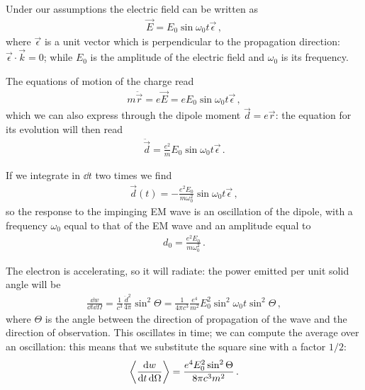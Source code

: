 \documentclass[main.tex]{subfiles}
\begin{document}

Under our assumptions the electric field can be written as 
%
\begin{align}
\vec{E} = E_0 \sin \omega_0 t \vec{\epsilon}
\,,
\end{align}
%
where \(\vec{\epsilon}\) is a unit vector which is perpendicular to the propagation direction: \(\vec{\epsilon} \cdot \vec{k} = 0\); while \(E_0 \) is the amplitude of the electric field and \(\omega_0\) is its frequency. 

The equations of motion of the charge read 
%
\begin{align}
m \ddot{\vec{r}} = e \vec{E} = e E_0 \sin \omega_0 t \vec{\epsilon}
\,,
\end{align}
%
which  we can also express through the dipole moment \(\vec{d} = e \vec{r}\): the equation for its evolution will then read 
%
\begin{align}
\ddot{\vec{d}} = \frac{e^2}{m} E_0 \sin \omega_0 t \vec{\epsilon }
\,.
\end{align}

If we integrate in \(\dd{t}\) two times we find 
%
\begin{align}
\vec{d} (t) = - \frac{e^2 E_0 }{m \omega_0^2} \sin \omega_0 t \vec{\epsilon}
\,,
\end{align}
%
so the response to the impinging EM wave is an oscillation of the dipole, with a frequency \(\omega_0\) equal to that of the EM wave and an amplitude equal to 
%
\begin{align}
d_0 = \frac{e^2 E_0 }{m \omega_0^2}
\,.
\end{align}

The electron is accelerating, so it will radiate: the power emitted per unit solid angle will be 
%
\begin{align}
\frac{ \dd{w}}{ \dd{t} \dd{\Omega }} = \frac{1}{c^3} \frac{ \ddot{d}^2}{4 \pi } \sin^2 \Theta 
= \frac{1}{4 \pi c^3} \frac{e^{4}}{m^2} E_0^2 \sin^2 \omega_0 t \sin^2 \Theta 
\,,
\end{align}
%
where \(\Theta \) is the angle between the direction of propagation of the wave and the direction of observation. 
This oscillates in time; we can compute the average over an oscillation: this means that we substitute the square sine with a factor \(1/2\): 
%
\begin{align}
\expval{\frac{ \dd{w}}{ \dd{t} \dd{\Omega }}} = 
\frac{e^{4} E_0^2 \sin^2 \Theta }{8 \pi c^3 m^2}
\,.
\end{align}
\end{document}

